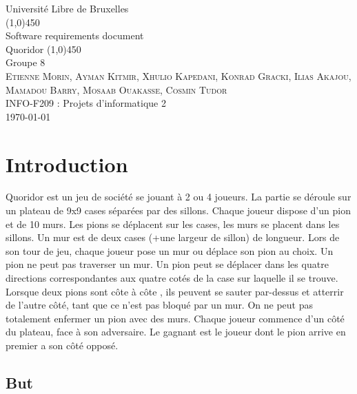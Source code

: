 \documentclass[a4paper,10pt]{article}
\begin{document}
\begin{titlepage}
    \setcounter{page}{1}
    \begin{center}
        \vspace*{0.5cm}
            \Huge{Université Libre de Bruxelles} \\
	\vfill
	\line(1,0){450} \\[1mm]
	    \Huge{Software requirements document}\\[3mm]
            {Quoridor}
	\line(1,0){450}\\
	\vfill
	    \Large Groupe 8 \\
            \textsc{Etienne Morin, Ayman Kitmir, Xhulio Kapedani, Konrad Gracki, Ilias Akajou, Mamadou Barry, Mosaab Ouakasse, Cosmin Tudor} \\

		INFO-F209 : Projets d'informatique 2\\
		\today\\
	\vspace{0.5cm}
    \end{center}
\end{titlepage}

\tableofcontents
\listoftables
\listoffigures


\newpage

\section{Introduction}

Quoridor est un jeu de société se jouant à 2 ou 4 joueurs.
La partie se déroule sur un plateau de 9x9 cases séparées par des sillons.
Chaque joueur dispose d'un pion et de 10 murs.
Les pions se déplacent sur les cases, les murs se placent dans les sillons. Un mur est de deux cases (+une largeur de sillon) de longueur.
Lors de son tour de jeu, chaque joueur pose un mur ou déplace son pion au choix. Un pion ne peut pas traverser un mur.
Un pion peut se déplacer dans les quatre directions correspondantes aux quatre cotés de la case sur laquelle il se trouve.
Lorsque deux pions sont côte à côte , ils peuvent se sauter par-dessus et atterrir de l'autre côté, tant que ce n'est pas bloqué par un mur. On ne peut pas totalement enfermer un pion avec des murs.
Chaque joueur commence d'un côté du plateau, face à son adversaire.
Le gagnant est le joueur dont le pion arrive en premier a son côté opposé.


\subsection{But}
\end{document}

